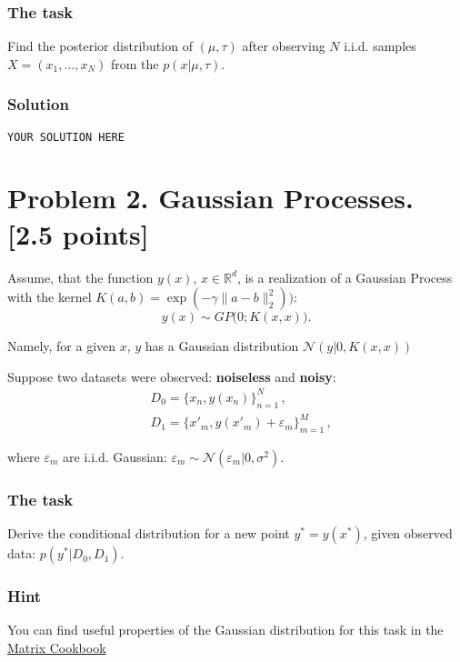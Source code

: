 \documentclass{article}
\begin{document}
\subsubsection*{The task}
Find the posterior distribution of $(\mu, \tau)$ after observing $N$ i.i.d. samples $X = (x_1, \dots, x_N)$ from the $p(x|\mu, \tau)$.

\subsubsection*{Solution}
\texttt{YOUR SOLUTION HERE}


\section*{Problem 2. Gaussian Processes. [2.5 points]}

Assume, that the function $y(x)$, $x \in \mathbb{R}^d$, is a realization of a Gaussian
Process with the kernel $K(a, b) = \exp({- \gamma \|a - b\|_2^2}))$:
\begin{equation}
y(x) \sim GP\bigl(0; K(x, x)\bigr).    
\end{equation}

Namely, for a given $x$, $y$ has a Gaussian distribution $\mathcal{N}(y|0, K(x, x))$
 

Suppose two datasets were observed: \textbf{noiseless} and \textbf{noisy}:
\begin{align}
    & D_0 = \{ x_n, y(x_n) \}_{n=1}^{N} \,, \\
    & D_1 = \{x'_m, y(x'_m) + \varepsilon_m \}_{m=1}^{M} \,,
\end{align}

where $\varepsilon_m$ are i.i.d. Gaussian:  $\varepsilon_m \sim \mathcal{N}(\varepsilon_m | 0, \sigma^2)$.

\subsubsection*{The task}
Derive the conditional distribution for a new point $y^* = y(x^*)$, given observed data: $p(y^* \big\vert {D_0, D_1})$.

\subsubsection*{Hint} You can find useful properties of the Gaussian distribution for this task in the \href{http://www.math.uwaterloo.ca/~hwolkowi//matrixcookbook.pdf}{Matrix Cookbook}
\end{document}
